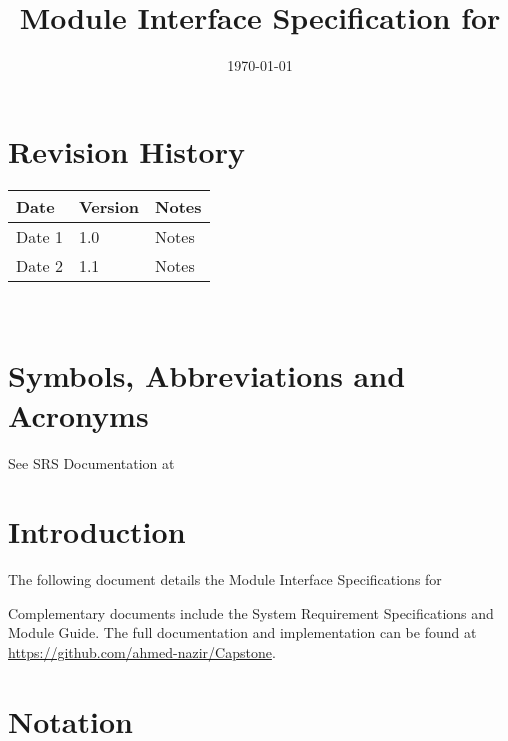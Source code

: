 \documentclass[12pt, titlepage]{article}
\begin{document}
\title{Module Interface Specification for \progname{}}

\author{\authname}

\date{\today}

\maketitle


\section{Revision History}

\begin{tabularx}{\textwidth}{p{3cm}p{2cm}X}
\toprule {\bf Date} & {\bf Version} & {\bf Notes}\\
\midrule
Date 1 & 1.0 & Notes\\
Date 2 & 1.1 & Notes\\
\bottomrule
\end{tabularx}

~\newpage

\section{Symbols, Abbreviations and Acronyms}

See SRS Documentation at 


\newpage

\tableofcontents

\newpage


\section{Introduction}

The following document details the Module Interface Specifications for

Complementary documents include the System Requirement Specifications
and Module Guide.  The full documentation and implementation can be
found at \url{https://github.com/ahmed-nazir/Capstone}.  

\section{Notation}
\end{document}
